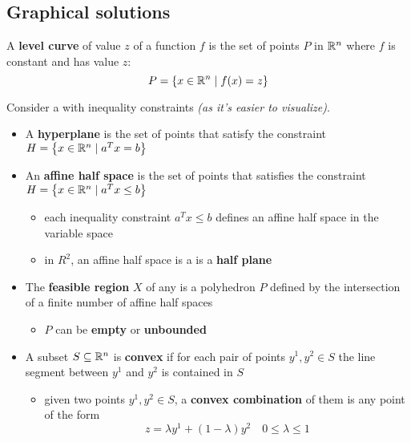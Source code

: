 \documentclass[english]{article}
\begin{document}
\subsection{Graphical solutions}

\begin{definition}
  \label{def:level-curve}
  A \textbf{level curve} of value \(z\) of a function \(f\) is the set of points \(P\) in \(\mathbb{R}^n\) where \(f\) is constant and has value \(z\):
  \[P = \left\{ x \in \mathbb{R}^n \mid f(x) = z \right\}\]
\end{definition}

\bigskip
Consider a \LP with inequality constraints \textit{(as it's easier to visualize)}.

\begin{itemize}
  \item A \textbf{hyperplane} is the set of points that satisfy the constraint
        \( H = \left\{ x \in \mathbb{R}^n \mid   a^T x = b \right\} \)
  \item An \textbf{affine half space} is the set of points that satisfies the constraint
        \(H = \left\{ x \in \mathbb{R}^n \mid   a^T x \leq b \right\} \)
        \begin{itemize}[label=\(\rightarrow\)]
          \item each inequality constraint \(a^T x \leq b\) defines an affine half space in the variable space
          \item in \(R^2\), an affine half space is a is a \textbf{half plane}
        \end{itemize}
  \item The \textbf{feasible region} \(X\) of any \LP is a polyhedron \(P\) defined by the intersection of a finite number of affine half spaces
        \begin{itemize}[label=\(\rightarrow\)]
          \item \(P\) can be \textbf{empty} or \textbf{unbounded}
        \end{itemize}
  \item A subset \(S \subseteq \mathbb{R}^n\) is \textbf{convex} if for each pair of points \(y^1, y^2 \in S\) the line segment between \(y^1\) and \(y^2\) is contained in \(S\)
        \begin{itemize}[label=\(\rightarrow\)]
          \item given two points \(y^1, y^2 \in S\), a \textbf{convex combination} of them is any point of the form
                \[ z = \lambda y^1 + \left( 1 - \lambda \right) y^2 \quad 0 \leq \lambda \leq 1 \]

\end{itemize}
\end{itemize}
\end{document}
